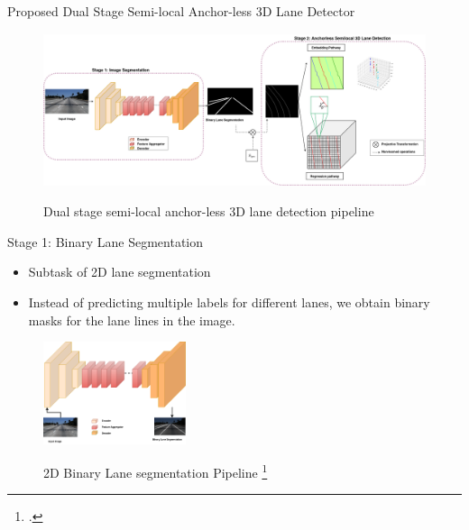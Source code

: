 \documentclass[aspectratio=169]{beamer}
\begin{document}
\begin{frame}{Proposed Dual Stage Semi-local Anchor-less 3D Lane Detector}


 \begin{figure}[H]
     \centering
     
\includegraphics[width=0.8\linewidth, height=4.5cm]{images/3DlaneAUXNet.png} 
\label{fig:subim1}

\caption{Dual stage semi-local anchor-less 3D lane detection pipeline }
\label{fig:image2}
\end{figure}
\end{frame}


\begin{frame}{Stage 1: Binary Lane Segmentation}
    \begin{itemize}
        \item Subtask of 2D lane segmentation
        \item Instead of predicting multiple labels for different lanes, we obtain binary masks for the lane lines in the image.
    \end{itemize}

\begin{figure}[H]
     \centering
     
\includegraphics[width=0.4\linewidth, height=3cm]{images/2dlane_pipleline.png} 
\label{fig:subim1}

\caption{2D Binary Lane segmentation Pipeline \footcite{Tusimple} }
\label{fig:image2}
\end{figure}
\end{frame}
\end{document}
